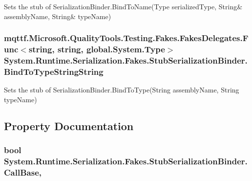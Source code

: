 Sets the stub of Serialization\-Binder.\-Bind\-To\-Name(Type serialized\-Type, String\& assembly\-Name, String\& type\-Name)

\hypertarget{class_system_1_1_runtime_1_1_serialization_1_1_fakes_1_1_stub_serialization_binder_a5a25ac40e3610031496b0ce32ed02b33}{
\subsubsection[{Bind\-To\-Type\-String\-String}]{\setlength{\rightskip}{0pt plus 5cm}mqttf.\-Microsoft.\-Quality\-Tools.\-Testing.\-Fakes.\-Fakes\-Delegates.\-Func$<$string, string, global.\-System.\-Type$>$ System.\-Runtime.\-Serialization.\-Fakes.\-Stub\-Serialization\-Binder.\-Bind\-To\-Type\-String\-String}}\label{class_system_1_1_runtime_1_1_serialization_1_1_fakes_1_1_stub_serialization_binder_a5a25ac40e3610031496b0ce32ed02b33}


Sets the stub of Serialization\-Binder.\-Bind\-To\-Type(\-String assembly\-Name, String type\-Name)



\subsection{Property Documentation}
\hypertarget{class_system_1_1_runtime_1_1_serialization_1_1_fakes_1_1_stub_serialization_binder_a4ad5e667a1aca181283404c8a88c1fdd}{
\subsubsection[{Call\-Base}]{\setlength{\rightskip}{0pt plus 5cm}bool System.\-Runtime.\-Serialization.\-Fakes.\-Stub\-Serialization\-Binder.\-Call\-Base\hspace{0.3cm}{\ttfamily [get]}, {\ttfamily [set]}}}\label{class_system_1_1_runtime_1_1_serialization_1_1_fakes_1_1_stub_serialization_binder_a4ad5e667a1aca181283404c8a88c1fdd}


